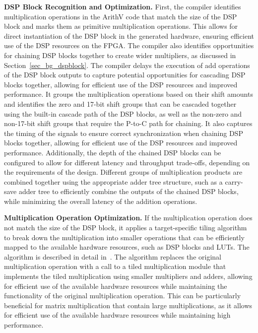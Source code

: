 \noindent\textbf{DSP Block Recognition and Optimization.} \label{sec_opt_dsp}
First, the compiler identifies multiplication operations in the ArithV code that match the size of the DSP block and marks them as primitive multiplication operations.
This allows for direct instantiation of the DSP block in the generated hardware, ensuring efficient use of the DSP resources on the FPGA.
The compiler also identifies opportunities for chaining DSP blocks together to create wider multipliers, as discussed in Section~\ref{sec_bg_dspblock}.
The compiler delays the execution of add operations of the DSP block outputs to capture potential opportunities for cascading DSP blocks together, allowing for efficient use of the DSP resources and improved performance.
It groups the multiplication operations based on their shift amounts and identifies the zero and 17-bit shift groups that can be cascaded together using the built-in cascade path of the DSP blocks, as well as the non-zero and non-17-bit shift groups that require the P-to-C path for chaining.
It also captures the timing of the signals to ensure correct synchronization when chaining DSP blocks together, allowing for efficient use of the DSP resources and improved performance.
Additionally, the depth of the chained DSP blocks can be configured to allow for different latency and throughput trade-offs, depending on the requirements of the design.
Different groups of multiplication products are combined together using the appropriate adder tree structure, such as a carry-save adder tree to efficiently combine the outputs of the chained DSP blocks, while minimizing the overall latency of the addition operations.

\noindent\textbf{Multiplication Operation Optimization.}
If the multiplication operation does not match the size of the DSP block, it applies a target-specific tiling algorithm to break down the multiplication into smaller operations that can be efficiently mapped to the available hardware resources, such as DSP blocks and LUTs.
The algorithm is described in detail in~\cite{royTileMultiplicationEfficient2014}. 
The algorithm replaces the original multiplication operation with a call to a tiled multiplication module that implements the tiled multiplication using smaller multipliers and adders, allowing for efficient use of the available hardware resources while maintaining the functionality of the original multiplication operation.
This can be particularly beneficial for matrix multiplication that contain large multiplications, as it allows for efficient use of the available hardware resources while maintaining high performance.



